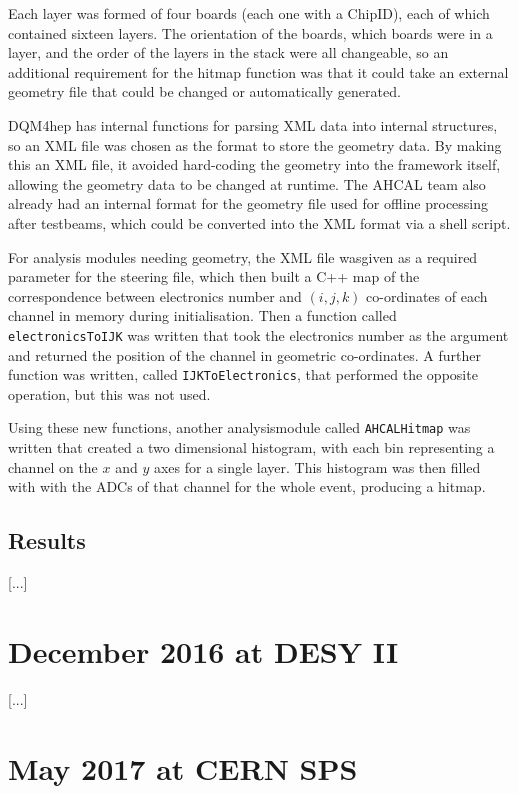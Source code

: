 Each layer was formed of four boards (each one with a ChipID), each of which contained sixteen layers. The orientation of the boards, which boards were in a layer, and the order of the layers in the stack were all changeable, so an additional requirement for the hitmap function was that it could take an external geometry file that could be changed or automatically generated. 

DQM4hep has internal functions for parsing XML data into internal structures, so an XML file was chosen as the format to store the geometry data. By making this an XML file, it avoided hard-coding the geometry into the framework itself, allowing the geometry data to be changed at runtime. The AHCAL team also already had an internal format for the geometry file used for offline processing after testbeams, which could be converted into the XML format via a shell script.

For analysis modules needing geometry, the XML file wasgiven as a required parameter for the steering file, which then built a C++ map of the correspondence between electronics number and $(i,j,k)$ co-ordinates of each channel in memory during initialisation. Then a function called \texttt{electronicsToIJK} was written that took the electronics number as the argument and returned the position of the channel in geometric co-ordinates. A further function was written, called \texttt{IJKToElectronics}, that performed the opposite operation, but this was not used. 

Using these new functions, another analysismodule called \texttt{AHCALHitmap} was written that created a two dimensional histogram, with each bin representing a channel on the $x$ and $y$ axes for a single layer. This histogram was then filled with with the ADCs of that channel for the whole event, producing a hitmap.

\subsection{Results}
[...]

\section{December 2016 at DESY II} %
[...]

\section{May 2017 at CERN SPS} %

